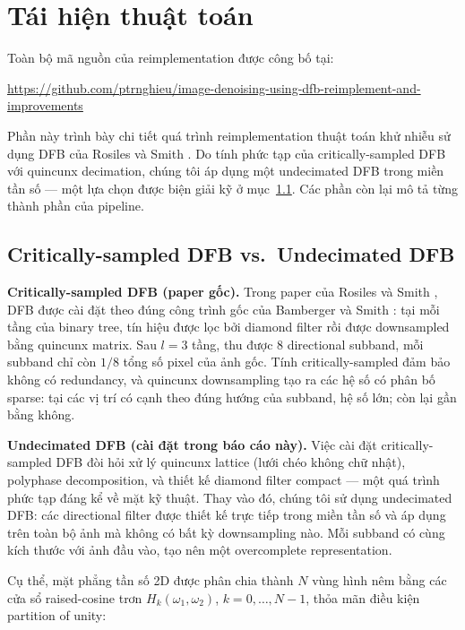 \section{Tái hiện thuật toán}
\label{sec:reimplementation}

Toàn bộ mã nguồn của reimplementation được công bố tại:
\begin{center}
    \url{https://github.com/ptrnghieu/image-denoising-using-dfb-reimplement-and-improvements}
\end{center}

Phần này trình bày chi tiết quá trình reimplementation thuật toán khử nhiễu sử dụng DFB của Rosiles và Smith \cite{rosiles2000}. Do tính phức tạp của critically-sampled DFB với quincunx decimation, chúng tôi áp dụng một undecimated DFB trong miền tần số — một lựa chọn được biện giải kỹ ở mục~\ref{subsec:undecimated}. Các phần còn lại mô tả từng thành phần của pipeline.

\subsection{Critically-sampled DFB vs.\ Undecimated DFB}
\label{subsec:undecimated}

\textbf{Critically-sampled DFB (paper gốc).}
Trong paper của Rosiles và Smith \cite{rosiles2000}, DFB được cài đặt theo đúng công trình gốc của Bamberger và Smith \cite{bamberger1992}: tại mỗi tầng của binary tree, tín hiệu được lọc bởi diamond filter rồi được downsampled bằng quincunx matrix. Sau $l = 3$ tầng, thu được 8 directional subband, mỗi subband chỉ còn $1/8$ tổng số pixel của ảnh gốc. Tính critically-sampled đảm bảo không có redundancy, và quincunx downsampling tạo ra các hệ số có phân bố sparse: tại các vị trí có cạnh theo đúng hướng của subband, hệ số lớn; còn lại gần bằng không.

\textbf{Undecimated DFB (cài đặt trong báo cáo này).}
Việc cài đặt critically-sampled DFB đòi hỏi xử lý quincunx lattice (lưới chéo không chữ nhật), polyphase decomposition, và thiết kế diamond filter compact — một quá trình phức tạp đáng kể về mặt kỹ thuật. Thay vào đó, chúng tôi sử dụng undecimated DFB: các directional filter được thiết kế trực tiếp trong miền tần số và áp dụng trên toàn bộ ảnh mà không có bất kỳ downsampling nào. Mỗi subband có cùng kích thước với ảnh đầu vào, tạo nên một overcomplete representation.

Cụ thể, mặt phẳng tần số 2D được phân chia thành $N$ vùng hình nêm bằng các cửa sổ raised-cosine trơn $H_k(\omega_1, \omega_2)$, $k = 0, \ldots, N-1$, thỏa mãn điều kiện partition of unity:

